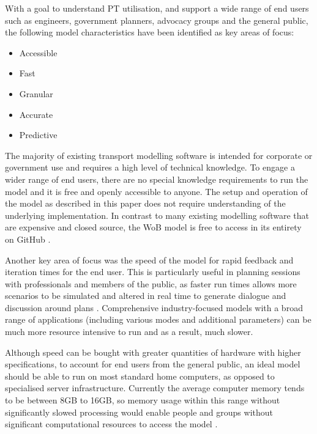 With a goal to understand PT utilisation, and support a wide range of end users such as engineers, government planners, advocacy groups and the general public, the following model characteristics have been identified as key areas of focus:

\begin{SingleSpacing}
\begin{itemize}
    \item Accessible
    \item Fast
    \item Granular
    \item Accurate
    \item Predictive
\end{itemize}
\end{SingleSpacing}

The majority of existing transport modelling software is intended for corporate or government use and requires a high level of technical knowledge. To engage a wider range of end users, there are no special knowledge requirements to run the model and it is free and openly accessible to anyone. The setup and operation of the model as described in this paper does not require understanding of the underlying implementation. In contrast to many existing modelling software that are expensive and closed source, the WoB model is free to access in its entirety on GitHub \cite{bensutherlandWhosBoardRail2024}.

Another key area of focus was the speed of the model for rapid feedback and iteration times for the end user. This is particularly useful in planning sessions with professionals and members of the public, as faster run times allows more scenarios to be simulated and altered in real time to generate dialogue and discussion around plans \cite{levinsonApplicationsAccess}. Comprehensive industry-focused models with a broad range of applications (including various modes and additional parameters) can be much more resource intensive to run and as a result, much slower.

Although speed can be bought with greater quantities of hardware with higher specifications, to account for end users from the general public, an ideal model should be able to run on most standard home computers, as opposed to specialised server infrastructure. Currently the average computer memory tends to be between 8GB to 16GB, so memory usage within this range without significantly slowed processing would enable people and groups without significant computational resources to access the model \cite{SpecificationsPersonalComputers}. 

